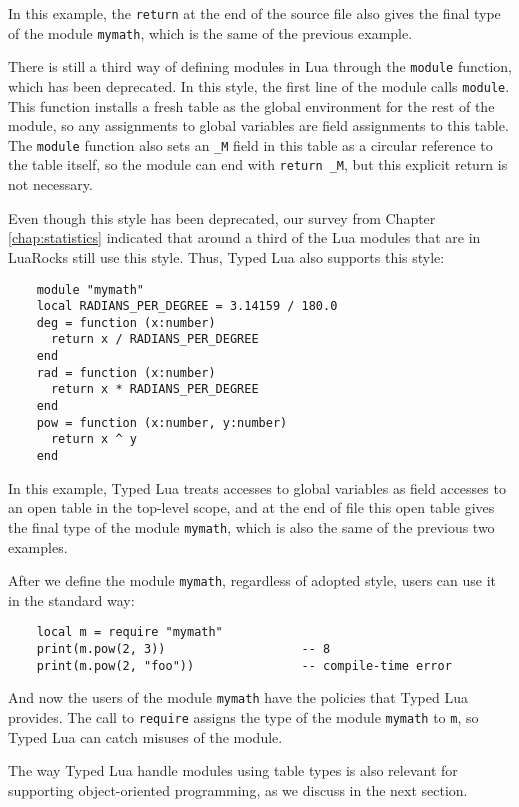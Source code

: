 In this example, the \texttt{return} at the end of the source file
also gives the final type of the module \texttt{mymath}, which is
the same of the previous example.

There is still a third way of defining modules in Lua through the
\texttt{module} function, which has been deprecated.
In this style, the first line of the module calls \texttt{module}.
This function installs a fresh table as the global environment for
the rest of the module, so any assignments to global variables are
field assignments to this table.
The \texttt{module} function also sets an \texttt{\string_M} field
in this table as a circular reference to the table itself,
so the module can end with \texttt{return \string_M},
but this explicit return is not necessary.

Even though this style has been deprecated, our survey from
Chapter \ref{chap:statistics} indicated that around a third of the
Lua modules that are in LuaRocks still use this style.
Thus, Typed Lua also supports this style:
\begin{verbatim}
    module "mymath"
    local RADIANS_PER_DEGREE = 3.14159 / 180.0
    deg = function (x:number)
      return x / RADIANS_PER_DEGREE
    end
    rad = function (x:number)
      return x * RADIANS_PER_DEGREE
    end
    pow = function (x:number, y:number)
      return x ^ y
    end
\end{verbatim}

In this example, Typed Lua treats accesses to global variables as
field accesses to an open table in the top-level scope,
and at the end of file this open table gives the final type of the
module \texttt{mymath}, which is also the same of the previous two
examples.

After we define the module \texttt{mymath}, regardless of adopted style,
users can use it in the standard way:
\begin{verbatim}
    local m = require "mymath"
    print(m.pow(2, 3))                   -- 8
    print(m.pow(2, "foo"))               -- compile-time error
\end{verbatim}

And now the users of the module \texttt{mymath} have the policies that
Typed Lua provides.
The call to \texttt{require} assigns the type of the module \texttt{mymath}
to \texttt{m}, so Typed Lua can catch misuses of the module.

The way Typed Lua handle modules using table types is also
relevant for supporting object-oriented programming, as we discuss in
the next section.

